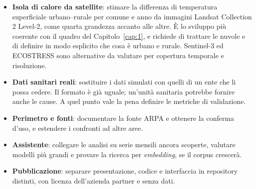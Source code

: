 \begin{itemize}
  \item \textbf{Isola di calore da satellite}: stimare la differenza di temperatura superficiale urbano--rurale per comune e anno da immagini Landsat Collection 2 Level-2, come quarta grandezza accanto alle altre. È lo sviluppo più coerente con il quadro del Capitolo~\ref{cap:1}, e richiede di trattare le nuvole e di definire in modo esplicito che cosa è urbano e rurale. Sentinel-3 ed ECOSTRESS sono alternative da valutare per copertura temporale e risoluzione.
  \item \textbf{Dati sanitari reali}: sostituire i dati simulati con quelli di un ente che li possa cedere. Il formato è già uguale; un'unità sanitaria potrebbe fornire anche le cause. A quel punto vale la pena definire le metriche di validazione.
  \item \textbf{Perimetro e fonti}: documentare la fonte ARPA e ottenere la conferma d'uso, e estendere i confronti ad altre aree.
  \item \textbf{Assistente}: collegare le analisi su serie mensili ancora scoperte, valutare modelli più grandi e provare la ricerca per \emph{embedding}, se il corpus crescerà.
  \item \textbf{Pubblicazione}: separare presentazione, codice e interfaccia in repository distinti, con licenza dell'azienda partner e senza dati.
\end{itemize}

